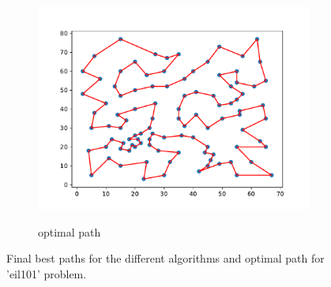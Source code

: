 \documentclass[12pt]{article}
\theoremstyle{plain}
\theoremstyle{definition}
\theoremstyle{remark}
\begin{document}
\begin{figure}[ht]
\begin{subfigure}{.5\textwidth}
		\includegraphics[scale = 0.44]{../../Implementation/gen/optimal_path_eil101}
		\label{fig:optimal_path_eil101}
		\caption{optimal path}
	\end{subfigure}
	\caption{Final best paths for the different algorithms and optimal path for 'eil101' problem.}
	\label{fig:final_paths_eil101}
\end{figure}
\newpage
\end{document}
